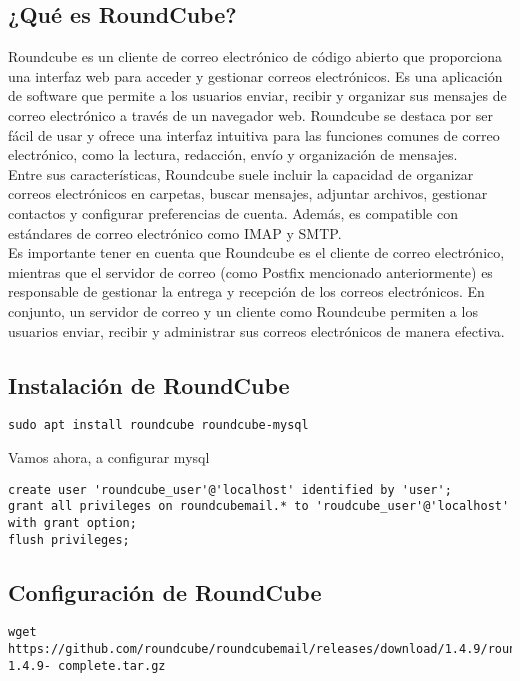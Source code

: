 \documentclass{article}
\begin{document}
\subsection{¿Qué es RoundCube?}

Roundcube es un cliente de correo electrónico de código abierto que proporciona una interfaz web para acceder y gestionar correos electrónicos. Es una aplicación de software que permite a los usuarios enviar, recibir y organizar sus mensajes de correo electrónico a través de un navegador web. Roundcube se destaca por ser fácil de usar y ofrece una interfaz intuitiva para las funciones comunes de correo electrónico, como la lectura, redacción, envío y organización de mensajes.\\


Entre sus características, Roundcube suele incluir la capacidad de organizar correos electrónicos en carpetas, buscar mensajes, adjuntar archivos, gestionar contactos y configurar preferencias de cuenta. Además, es compatible con estándares de correo electrónico como IMAP y SMTP.\\


Es importante tener en cuenta que Roundcube es el cliente de correo electrónico, mientras que el servidor de correo (como Postfix mencionado anteriormente) es responsable de gestionar la entrega y recepción de los correos electrónicos. En conjunto, un servidor de correo y un cliente como Roundcube permiten a los usuarios enviar, recibir y administrar sus correos electrónicos de manera efectiva.

\subsection{Instalación de RoundCube}
\lstset{language=Bash, breaklines=true, basicstyle=\footnotesize}
\begin{lstlisting}[frame=single]
sudo apt install roundcube roundcube-mysql
\end{lstlisting}
Vamos ahora, a configurar mysql
\lstset{language=Bash, breaklines=true, basicstyle=\footnotesize}
\begin{lstlisting}[frame=single]
create user 'roundcube_user'@'localhost' identified by 'user';
grant all privileges on roundcubemail.* to 'roudcube_user'@'localhost' with grant option;
flush privileges;
\end{lstlisting}

\subsection{Configuración de RoundCube}
\lstset{language=Bash, breaklines=true, basicstyle=\footnotesize}
\begin{lstlisting}[frame=single]
wget https://github.com/roundcube/roundcubemail/releases/download/1.4.9/roundcubemail-1.4.9- complete.tar.gz
\end{lstlisting}
\end{document}
